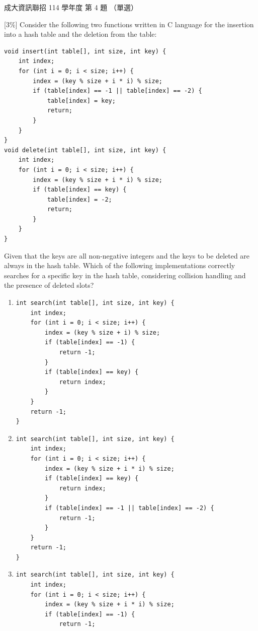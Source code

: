 \begin{pastexam}[label={px:ncku-114-prog-04}]{成大資訊聯招 114 學年度 第 4 題}
（單選）

{[3\%]} Consider the following two functions written in C language for the insertion into a hash table and the deletion from the table:
\begin{verbatim}
void insert(int table[], int size, int key) {
    int index;
    for (int i = 0; i < size; i++) {
        index = (key % size + i * i) % size;
        if (table[index] == -1 || table[index] == -2) {
            table[index] = key;
            return;
        }
    }
}
void delete(int table[], int size, int key) {
    int index;
    for (int i = 0; i < size; i++) {
        index = (key % size + i * i) % size;
        if (table[index] == key) {
            table[index] = -2;
            return;
        }
    }
}
\end{verbatim}
Given that the keys are all non-negative integers and the keys to be deleted are always in the hash table. Which of the following implementations correctly searches for a specific key in the hash table, considering collision handling and the presence of deleted slots?
\begin{enumerate}[label=(\Alph*)]
\item \leavevmode
\begin{verbatim}
int search(int table[], int size, int key) {
    int index;
    for (int i = 0; i < size; i++) {
        index = (key % size + i) % size;
        if (table[index] == -1) {
            return -1;
        }
        if (table[index] == key) {
            return index;
        }
    }
    return -1;
}
\end{verbatim}
\item \leavevmode
\begin{verbatim}
int search(int table[], int size, int key) {
    int index;
    for (int i = 0; i < size; i++) {
        index = (key % size + i * i) % size;
        if (table[index] == key) {
            return index;
        }
        if (table[index] == -1 || table[index] == -2) {
            return -1;
        }
    }
    return -1;
}
\end{verbatim}
\item \leavevmode
\begin{verbatim}
int search(int table[], int size, int key) {
    int index;
    for (int i = 0; i < size; i++) {
        index = (key % size + i * i) % size;
        if (table[index] == -1) {
            return -1;

\end{verbatim}
\end{enumerate}
\end{pastexam}
